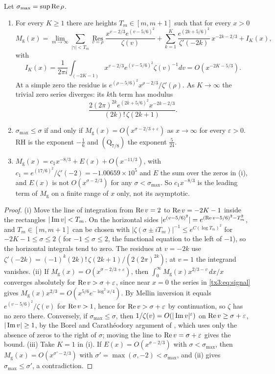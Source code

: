 \begin{proposition}\label{tx3:prop:signal}
Let $\sigma_{\max}=\sup\operatorname{Re}\rho$.
\begin{enumerate}
\item[(i)] For every $K\ge1$ there are heights $T_m\in[m,m+1]$ such that for every $x>0$
\[
M_{\mathrm g}(x)=\lim_{m\to\infty}\sum_{|\gamma|<T_m}\operatorname*{Res}_{v=\rho}\frac{x^{v-2/3}e^{(v-5/6)^2}}{\zeta(v)}+\sum_{k=1}^K\frac{e^{(2k+5/6)^2}}{\zeta'(-2k)}\,x^{-2k-2/3}+I_K(x),
\]
with
\[
I_K(x)=\frac1{2\pi i}\int_{(-2K-1)}x^{v-2/3}e^{(v-5/6)^2}\zeta(v)^{-1}dv=O(x^{-2K-5/3}).
\]
At a simple zero the residue is $e^{(\rho-5/6)^2}x^{\rho-2/3}/\zeta'(\rho)$. As $K\to\infty$ the trivial zero series diverges: its $k$th term has modulus
\[
\frac{2(2\pi)^{2k}e^{(2k+5/6)^2}x^{-2k-2/3}}{(2k)!\,\zeta(2k+1)}.
\]
\item[(ii)] $\sigma_{\max}\le\sigma$ if and only if $M_{\mathrm g}(x)=O(x^{\sigma-2/3+\varepsilon})$ as $x\to\infty$ for every $\varepsilon>0$. RH is the exponent $-\frac16$ and $(\mathrm Q_{7/8})$ the exponent $\frac5{24}$.
\item[(iii)] $M_{\mathrm g}(x)=c_1x^{-8/3}+E(x)+O(x^{-11/3})$, with $c_1=e^{(17/6)^2}/\zeta'(-2)=-1.00659\times10^5$ and $E$ the sum over the zeros in (i), and $E(x)$ is not $O(x^{\sigma-2/3})$ for any $\sigma<\sigma_{\max}$. So $c_1x^{-8/3}$ is the leading term of $M_{\mathrm g}$ on a finite range of $x$ only, not its asymptotic.
\end{enumerate}
\end{proposition}

\begin{proof}
(i) Move the line of integration from $\operatorname{Re} v=2$ to $\operatorname{Re} v=-2K-1$ inside the rectangles $|\operatorname{Im} v|<T_m$. On the horizontal sides $|e^{(v-5/6)^2}|=e^{(\operatorname{Re} v-5/6)^2-T_m^2}$, and $T_m\in[m,m+1]$ can be chosen with $|\zeta(\sigma\pm iT_m)|^{-1}\le e^{C(\log T_m)^2}$ for $-2K-1\le\sigma\le2$ (\cite[Chapter 9]{Titchmarsh} for $-1\le\sigma\le2$, the functional equation to the left of $-1$), so the horizontal integrals tend to zero. The residues at $v=-2k$ use $\zeta'(-2k)=(-1)^k(2k)!\,\zeta(2k+1)/(2(2\pi)^{2k})$; at $v=1$ the integrand vanishes. (ii) If $M_{\mathrm g}(x)=O(x^{\sigma-2/3+\varepsilon})$, then $\int_0^\infty M_{\mathrm g}(x)x^{2/3-v}\,dx/x$ converges absolutely for $\operatorname{Re} v>\sigma+\varepsilon$, since near $x=0$ the series in \eqref{tx3:eq:signal} gives $M_{\mathrm g}(x)x^{2/3}=O(x^{5/6}e^{-\log^2x/4})$. By Mellin inversion it equals $e^{(v-5/6)^2}/\zeta(v)$ for $\operatorname{Re} v>1$, hence for $\operatorname{Re} v>\sigma+\varepsilon$ by continuation, so $\zeta$ has no zero there. Conversely, if $\sigma_{\max}\le\sigma$, then $1/\zeta(v)=O(|\operatorname{Im} v|^{\varepsilon})$ on $\operatorname{Re} v\ge\sigma+\varepsilon$, $|\operatorname{Im} v|\ge1$, by the Borel and Carath\'eodory argument of \cite[Section 14.2]{Titchmarsh}, which uses only the absence of zeros to the right of $\sigma$; moving the line to $\operatorname{Re} v=\sigma+\varepsilon$ gives the bound. (iii) Take $K=1$ in (i). If $E(x)=O(x^{\sigma-2/3})$ with $\sigma<\sigma_{\max}$, then $M_{\mathrm g}(x)=O(x^{\sigma'-2/3})$ with $\sigma'=\max(\sigma,-2)<\sigma_{\max}$, and (ii) gives $\sigma_{\max}\le\sigma'$, a contradiction.
\end{proof}

